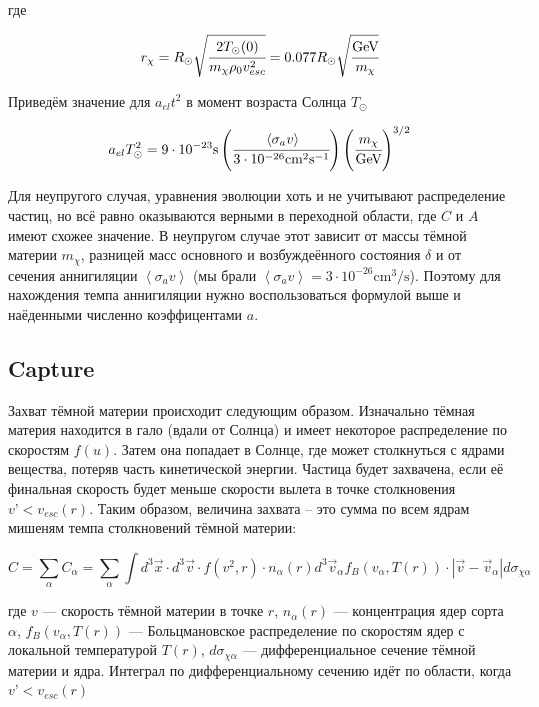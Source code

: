 \documentclass[a4paper, 14pt]{article}
\newcommand{\avarage}[1]{\left\langle #1 \right\rangle}
\begin{document}
где

\begin{equation}
	r_{\chi} = R_{\odot} \sqrt{\cfrac{2 T_{\odot}(0) }{m_{\chi}\rho_0 v_{esc}^2}} =  0.077 R_{\odot} \sqrt{\cfrac{ \text{GeV}}{m_{\chi}}}
\end{equation}

Приведём значение для $a_{el}t^2$ в момент возраста Солнца $T_{\odot}$

\begin{equation}
	a_{el}T_{\odot}^2 = 
	9\cdot10^{-23} \text{s}	\left(\cfrac{   \avarage{\sigma_{a}v}    }{3\cdot10^{-26} \text{cm}^2\text{s}^{-1}} \right)
	\left(\cfrac{m_{\chi}}{\text{GeV}}\right)^{3/2}
\end{equation}

Для неупругого случая, уравнения эволюции хоть и не учитывают распределение частиц, но всё равно оказываются верными в переходной области, где $C$ и $A$ имеют схожее значение. 
В неупругом случае этот зависит от массы тёмной материи $m_{\chi}$, разницей масс основного и возбуждеённого состояния $\delta$ и от сечения аннигиляции $\avarage{\sigma_{a}v}$ (мы брали $\avarage{\sigma_{a}v} = 3\cdot 10^{-26} \text{cm}^3/\text{s}$). Поэтому для нахождения темпа аннигиляции нужно воспользоваться формулой выше и наёденными численно коэффицентами $a$.
	\subsection{Capture}
	

Захват тёмной материи происходит следующим образом. Изначально тёмная материя находится в гало (вдали от Солнца) и имеет некоторое распределение по скоростям $f(u)$. Затем она попадает в Солнце, где может столкнуться с ядрами вещества, потеряв часть кинетической энергии. Частица будет захвачена, если её финальная скорость будет меньше скорости вылета в точке столкновения $v’ < v_{esc}(r)$. Таким образом, величина захвата – это сумма по всем ядрам мишеням темпа столкновений тёмной материи:

\begin{equation}
	\label{eq:Capture_Full}
	C = \sum_{\alpha} C_{\alpha} = \sum_{\alpha} \int{
		d^3\vec{x} \cdot d^3\vec{v} \cdot f(v^2,r) \cdot n_{\alpha}(r) 
		d^3\vec{v}_{\alpha} f_B(v_{\alpha},T(r)) \cdot
		|\vec{v}- \vec{v}_{\alpha}| d\sigma_{\chi \alpha}
	}
\end{equation}

где $v$ --- скорость тёмной материи в точке $r$, $n_{\alpha}(r)$ --- концентрация ядер сорта $\alpha$, $f_B(v_{\alpha},T(r))$ --- Больцмановское распределение по скоростям ядер с локальной температурой $T(r)$, $d\sigma_{\chi \alpha}$ --- дифференциальное сечение тёмной материи и ядра. Интеграл по дифференциальному сечению идёт по области, когда $v’ < v_{esc}(r)$
\end{document}
